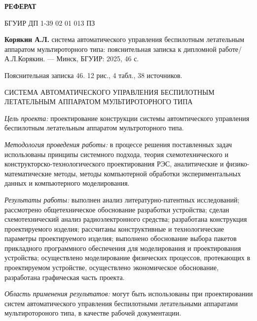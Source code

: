 \thispagestyle{empty} %

\begin{center}  
\textbf{РЕФЕРАТ}
\end{center}

БГУИР ДП 1-39 02 01 013 ПЗ

\textbf{Корякин А.Л.} система автоматического управления
беспилотным летательным аппаратом мультироторного типа:
пояснительная записка к дипломной работе/А.Л.Корякин.
— Минск, БГУИР: 2025, 46 с.

Пояснительная записка 46. 12 рис., 4 табл., 38 источников.

СИСТЕМА АВТОМАТИЧЕСКОГО УПРАВЛЕНИЯ БЕСПИЛОТНЫМ ЛЕТАТЕЛЬНЫМ АППАРАТОМ
МУЛЬТИРОТОРНОГО ТИПА

\textit{Цель проекта:} проектирование конструкции
системы автомтического управления беспилотным летательным аппаратом
мультроторного типа.

\textit{Методология проведения работы:}
в процессе решения поставленных задач использованы принципы системного
подхода, теория схемотехнического и конструкторско-технологического
проектирования РЭС, аналитические и физико-математические методы,
методы компьютерной обработки экспериментальных данных и компьютерного
моделирования.

\textit{Результаты работы:}
выполнен анализ литературно-патентных исследований; рассмотрено
общетехническое обоснование разработки устройства; сделан
схемотехнический анализ радиоэлектронного средства; разработана
конструкция проектируемого изделия; рассчитаны конструктивные и
технологические параметры проектируемого изделия; выполнено
обоснование выбора пакетов прикладного программного обеспечения для
моделирования и проектирования устройства; осуществлено моделирование
физических процессов, протекающих в проектируемом устройстве,
осуществлено экономическое обоснование, разработана графическая часть
проекта.

\textit{Область применения результатов:} могут быть использованы при
проектировании систем автоматического управления беспилотными
летательными аппаратами мультиротороного типа, в качестве рабочей
документации.

\newpage
